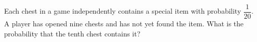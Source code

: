 Each chest in a game independently contains a special item with probability $\dfrac{1}{20}$. A player has opened nine chests and has not yet found the item. What is the probability that the tenth chest contains it?
